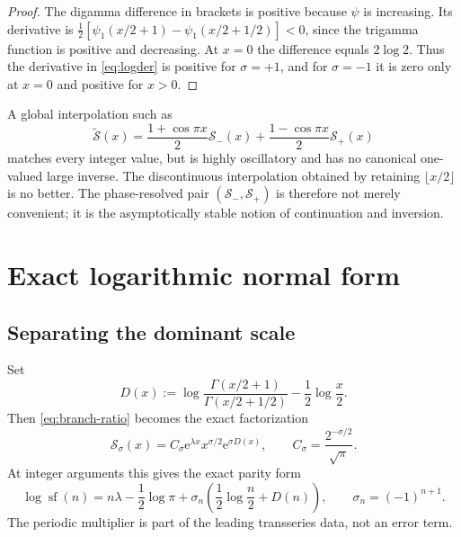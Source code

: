 \documentclass[11pt,a4paper]{article}
\numberwithin{equation}{section}
\theoremstyle{definition}
\theoremstyle{remark}
\newcommand{\e}{\mathrm e}
\newcommand{\SF}{\operatorname{sf}}
\begin{document}
\begin{proof}
The digamma difference in brackets is positive because \(\psi\) is
increasing.  Its derivative is
\(\tfrac12[\psi_1(x/2+1)-\psi_1(x/2+1/2)]<0\), since the trigamma function is
positive and decreasing.  At \(x=0\) the difference equals \(2\log2\).
Thus the derivative in \cref{eq:logder} is positive for \(\sigma=+1\), and
for \(\sigma=-1\) it is zero only at \(x=0\) and positive for \(x>0\).
\end{proof}

\begin{cautionbox}
A global interpolation such as
\[
 \widetilde{\mathcal S}(x)=
 \frac{1+\cos\pi x}{2}\mathcal S_-(x)
 +\frac{1-\cos\pi x}{2}\mathcal S_+(x)
\]
matches every integer value, but is highly oscillatory and has no canonical
one-valued large inverse.  The discontinuous interpolation obtained by
retaining \(\lfloor x/2\rfloor\) is no better.  The phase-resolved pair
\((\mathcal S_-,\mathcal S_+)\) is therefore not merely convenient; it is
the asymptotically stable notion of continuation and inversion.
\end{cautionbox}

\section{Exact logarithmic normal form}

\subsection{Separating the dominant scale}

Set
\begin{equation}\label{eq:D-def}
 D(x):=
 \log\frac{\Gamma(x/2+1)}{\Gamma(x/2+1/2)}
 -\frac12\log\frac{x}{2}.
\end{equation}
Then \cref{eq:branch-ratio} becomes the exact factorization
\begin{equation}\label{eq:exact-normal}
 \boxed{\quad
 \mathcal S_\sigma(x)=
 C_\sigma\e^{\lambda x}x^{\sigma/2}\e^{\sigma D(x)},
 \qquad
 C_\sigma=\frac{2^{-\sigma/2}}{\sqrt\pi}.
 \quad}
\end{equation}
At integer arguments this gives the exact parity form
\begin{equation}\label{eq:integer-log-exact}
 \log\SF(n)=n\lambda-\frac12\log\pi
 +\sigma_n\left(\frac12\log\frac n2+D(n)\right),
 \qquad \sigma_n=(-1)^{n+1}.
\end{equation}
The periodic multiplier is part of the leading transseries data, not an error
term.
\end{document}

